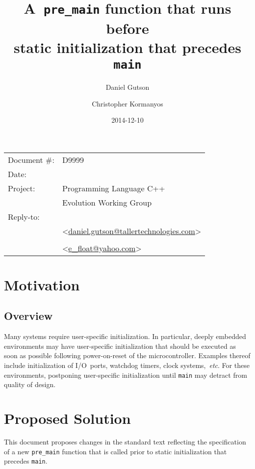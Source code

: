 \documentclass[11pt]{article}
\date{}
\title{\textbf{A~\lstinline{pre_main} function that runs before\\
                static initialization that precedes \lstinline{main}}}
\author{}
\makeatletter
\newcommand{\emailCK}{\href{mailto:e\_float@yahoo.com}{e\_float@yahoo.com}}
\newcommand{\emailDG}{\href{mailto:daniel.gutson@tallertechnologies.com}{daniel.gutson@tallertechnologies.com}}
\makeatother
\begin{document}
\maketitle\vspace{-2cm}

\begin{flushright}
  \begin{tabular}{ll}
  Document \#:&D9999\\
  Date:       &\date{2014-12-10}\\
  Project:    &Programming Language C++\\
              &Evolution Working Group\\
  Reply-to:   &\author{Daniel Gutson}\\
              &\textless\emailDG\textgreater\\
              &\author{Christopher Kormanyos}\\
              &\textless\emailCK\textgreater\\
  \end{tabular}
\end{flushright}

\section{Motivation}
\subsection*{Overview}
Many systems require user-specific initialization. In particular,
deeply embedded environments may have user-specific initialization
that should be executed as soon as possible following power-on-reset
of the microcontroller.
Examples thereof include initialization of I/O~ports, watchdog timers,
clock systems,~\emph{etc}. For these environments, postponing
user-specific initialization until \lstinline{main} may detract from
quality of design.

\section{Proposed Solution}
This document proposes changes in the standard text reflecting
the specification of a new \lstinline{pre_main} function
that is called prior to static initialization that
precedes \lstinline{main}.
\end{document}
